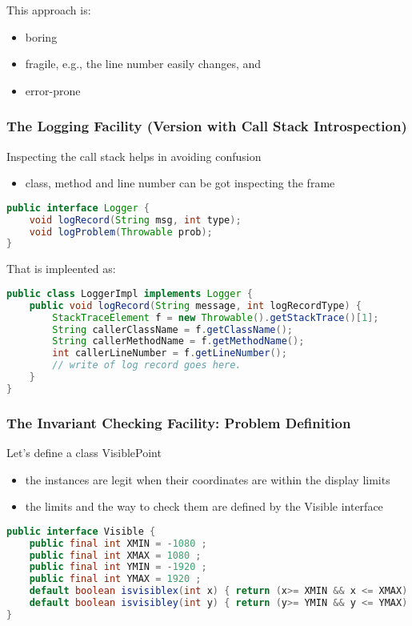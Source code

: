 This approach is:
\begin{itemize}
	\item boring
	\item fragile, e.g., the line number easily changes, and
	\item error-prone
\end{itemize}

\subsubsection{The Logging Facility (Version with Call Stack Introspection)}

Inspecting the call stack helps in avoiding confusion
\begin{itemize}
	\item class, method and line number can be got inspecting the frame
\end{itemize}

\begin{lstlisting}[language=Java]
public interface Logger {
	void logRecord(String msg, int type);
	void logProblem(Throwable prob);
}
\end{lstlisting}

That is impleented as:
\begin{lstlisting}[language=Java]
public class LoggerImpl implements Logger {
	public void logRecord(String message, int logRecordType) {
		StackTraceElement f = new Throwable().getStackTrace()[1];
		String callerClassName = f.getClassName();
		String callerMethodName = f.getMethodName();
		int callerLineNumber = f.getLineNumber();
		// write of log record goes here.
	}
}
\end{lstlisting}

\subsubsection{The Invariant Checking Facility: Problem Definition}

Let’s define a class VisiblePoint
\begin{itemize}
	\item the instances are legit when their coordinates are within the display limits
	\item the limits and the way to check them are defined by the Visible interface
\end{itemize}

\begin{lstlisting}[language=Java]
public interface Visible {
	public final int XMIN = -1080 ;
	public final int XMAX = 1080 ;
	public final int YMIN = -1920 ;
	public final int YMAX = 1920 ;
	default boolean isvisiblex(int x) { return (x>= XMIN && x <= XMAX) ; }
	default boolean isvisibley(int y) { return (y>= YMIN && y <= YMAX) ; }
}
\end{lstlisting}

